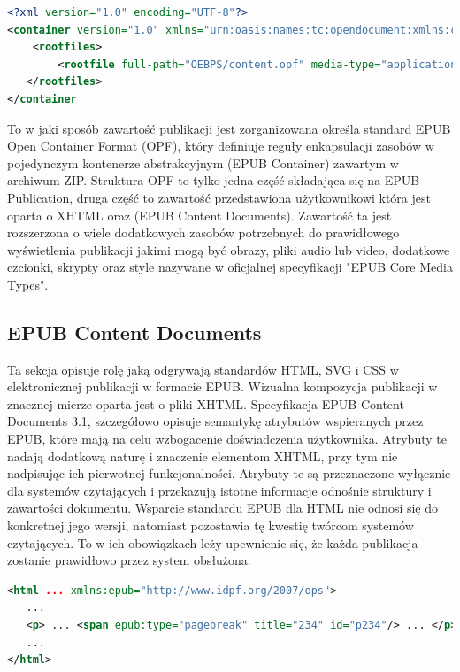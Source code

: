 \begin{lstlisting}[caption={Przykładowy plik container.xml}, language=XML]
<?xml version="1.0" encoding="UTF-8"?>
<container version="1.0" xmlns="urn:oasis:names:tc:opendocument:xmlns:container">
    <rootfiles>
        <rootfile full-path="OEBPS/content.opf" media-type="application/oebps-package+xml"/>
   </rootfiles>
</container
\end{lstlisting}

To w jaki sposób zawartość publikacji jest zorganizowana określa standard EPUB Open Container Format (OPF), który definiuje reguły enkapsulacji zasobów w pojedynczym kontenerze abstrakcyjnym (EPUB Container) zawartym w archiwum ZIP. Struktura OPF to tylko jedna część składająca się na EPUB Publication, druga część to zawartość przedstawiona użytkownikowi która jest oparta o XHTML oraz (EPUB Content Documents). Zawartość ta jest rozszerzona o wiele dodatkowych zasobów potrzebnych do prawidłowego wyświetlenia publikacji jakimi mogą być obrazy, pliki audio lub video, dodatkowe czcionki, skrypty oraz style nazywane w oficjalnej specyfikacji "EPUB Core Media Types".

\subsection{EPUB Content Documents}

Ta sekcja opisuje rolę jaką odgrywają standardów HTML, SVG i CSS w elektronicznej publikacji w formacie EPUB. Wizualna kompozycja publikacji w znacznej mierze oparta jest o pliki XHTML. Specyfikacja EPUB Content Documents 3.1, szczegółowo opisuje semantykę atrybutów wspieranych przez EPUB, które mają na celu wzbogacenie doświadczenia użytkownika. Atrybuty te nadają dodatkową naturę i znaczenie elementom XHTML, przy tym nie nadpisując ich pierwotnej funkcjonalności. Atrybuty te są przeznaczone wyłącznie dla systemów czytających i przekazują istotne informacje odnośnie struktury i zawartości dokumentu. Wsparcie standardu EPUB dla HTML nie odnosi się do konkretnej jego wersji, natomiast pozostawia tę kwestię twórcom systemów czytających. To w ich obowiązkach leży upewnienie się, że każda publikacja zostanie prawidłowo przez system obsłużona.

\begin{lstlisting}[float=h, caption={Przykładowe wykorzystanie atrybutu epub:type aby oznaczyć zakończenie linii.\protect\cite{EPUBContentDocumentsSpecificationXML}}, language=XML]
<html ... xmlns:epub="http://www.idpf.org/2007/ops">
   ...
   <p> ... <span epub:type="pagebreak" title="234" id="p234"/> ... </p>
   ...
</html>
\end{lstlisting}

